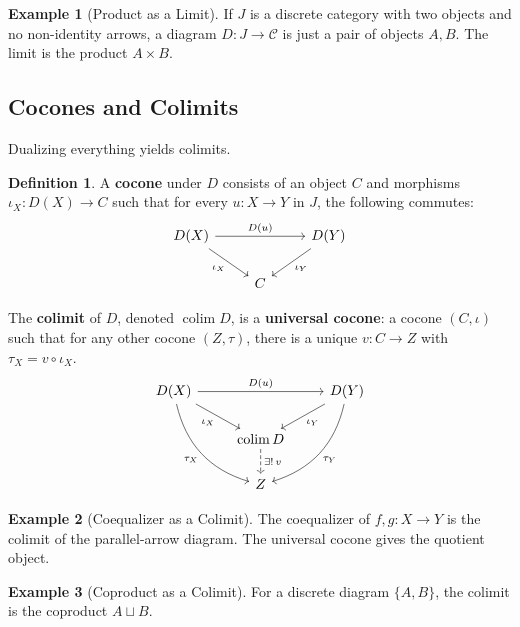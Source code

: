 \documentclass{article}
\theoremstyle{definition}
\newtheorem{definition}{Definition}[section]
\newtheorem{example}{Example}[section]
\begin{document}
\begin{example}[Product as a Limit]
If $J$ is a discrete category with two objects and no non-identity arrows, a diagram $D : J \to \mathcal{C}$ is just a pair of objects $A, B$. The limit is the product $A \times B$.
\end{example}

\subsection{Cocones and Colimits}
Dualizing everything yields colimits.

\begin{definition}
A \textbf{cocone} under $D$ consists of an object $C$ and morphisms $\iota_X : D(X) \to C$ such that for every $u : X \to Y$ in $J$, the following commutes:
\[
\begin{tikzcd}
D(X) \arrow[rr, "D(u)"] \arrow[dr, "\iota_X"'] & & D(Y) \arrow[dl, "\iota_Y"] \\
& C &
\end{tikzcd}
\]
\end{definition}

The \textbf{colimit} of $D$, denoted $\operatorname{colim} D$, is a \textbf{universal cocone}: a cocone $(C, \iota)$ such that for any other cocone $(Z, \tau)$, there is a unique $v : C \to Z$ with $\tau_X = v \circ \iota_X$.
\[
\begin{tikzcd}
D(X) \arrow[rr, "D(u)"] \arrow[dr, "\iota_X"'] \arrow[ddr, bend right, "\tau_X"'] & & D(Y) \arrow[dl, "\iota_Y"] \arrow[ddl, bend left, "\tau_Y"] \\
& \operatorname{colim} D \arrow[d, dashed, "\exists!\, v"] & \\
& Z &
\end{tikzcd}
\]

\begin{example}[Coequalizer as a Colimit]
The coequalizer of $f, g : X \to Y$ is the colimit of the parallel-arrow diagram. The universal cocone gives the quotient object.
\end{example}

\begin{example}[Coproduct as a Colimit]
For a discrete diagram $\{A, B\}$, the colimit is the coproduct $A \sqcup B$.
\end{example}
\end{document}
